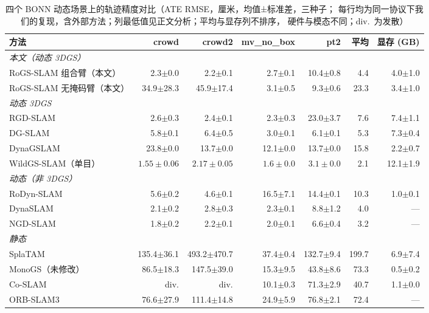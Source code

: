 \begin{table}[htbp]
\centering
\small
\setlength{\tabcolsep}{4pt}
\caption{四个 BONN 动态场景上的轨迹精度对比（ATE RMSE，厘米，均值±标准差，三种子；
每行均为同一协议下我们的复现，含外部方法；列最低值见正文分析；平均与显存列不排序，
硬件与模态不同；div.\ 为发散）}
\label{tab:study1-main}
\begin{tabular}{lrrrrrr}\toprule
方法 & crowd & crowd2 & mv\_no\_box & pt2 & 平均 & 显存 (GB) \\ \midrule
\multicolumn{7}{l}{\emph{本文（动态 3DGS）}} \\
RoGS-SLAM 组合臂（本文） & 2.3$\pm$0.0 & 2.2$\pm$0.1 & 2.7$\pm$0.1 & 10.4$\pm$0.8 & 4.4 & 4.0$\pm$1.0 \\
RoGS-SLAM 无掩码臂（本文） & 34.9$\pm$28.3 & 45.9$\pm$17.4 & 3.1$\pm$0.5 & 9.3$\pm$0.6 & 23.3 & 3.4$\pm$1.0 \\
\midrule
\multicolumn{7}{l}{\emph{动态 3DGS}} \\
RGD-SLAM~\cite{RGDSLAM} & 2.6$\pm$0.3 & 2.4$\pm$0.1 & 2.3$\pm$0.3 & 23.0$\pm$3.7 & 7.6 & 7.4$\pm$1.1 \\
DG-SLAM~\cite{dgslam} & 5.8$\pm$0.1 & 6.4$\pm$0.5 & 3.0$\pm$0.1 & 6.1$\pm$0.1 & 5.3 & 7.3$\pm$0.4 \\
DynaGSLAM~\cite{dynagslam} & 23.8$\pm$0.0 & 13.7$\pm$0.0 & 12.1$\pm$0.0 & 13.7$\pm$0.0 & 15.8 & 2.2$\pm$0.7 \\
WildGS-SLAM（单目）~\cite{WildGS} & {$1.55\pm0.06$} & {$2.17\pm0.05$} & {$1.6\pm0.0$} & {$3.1\pm0.0$} & 2.1 & 12.1$\pm$1.9 \\
\midrule
\multicolumn{7}{l}{\emph{动态（非 3DGS）}} \\
RoDyn-SLAM~\cite{rodynslam} & 5.6$\pm$0.2 & 4.6$\pm$0.1 & 16.5$\pm$7.1 & 14.4$\pm$0.1 & 10.3 & 1.0$\pm$0.1 \\
DynaSLAM~\cite{DynaSLAM} & 2.1$\pm$0.2 & 2.8$\pm$0.3 & 2.3$\pm$0.1 & 8.8$\pm$1.2 & 4.0 & --- \\
NGD-SLAM~\cite{NGDSLAM} & 1.8$\pm$0.2 & 2.2$\pm$0.1 & 2.0$\pm$0.1 & 6.6$\pm$0.4 & 3.2 & --- \\
\midrule
\multicolumn{7}{l}{\emph{静态}} \\
SplaTAM~\cite{SplaTAM} & 135.4$\pm$36.1 & 493.2$\pm$470.7 & 37.4$\pm$0.4 & 132.7$\pm$9.4 & 199.7 & 6.9$\pm$7.4 \\
MonoGS（未修改）~\cite{MonoGS} & 86.5$\pm$18.3 & 147.5$\pm$39.0 & 15.3$\pm$9.5 & 43.8$\pm$8.6 & 73.3 & 0.5$\pm$0.2 \\
Co-SLAM~\cite{CoSLAM} & div. & div. & 10.1$\pm$0.3 & 71.3$\pm$2.9 & 40.7 & 1.1$\pm$0.0 \\
ORB-SLAM3~\cite{ORBSLAM3} & 76.6$\pm$27.9 & 111.4$\pm$14.8 & 24.9$\pm$5.9 & 76.8$\pm$2.1 & 72.4 & --- \\
\bottomrule
\end{tabular}
\end{table}

